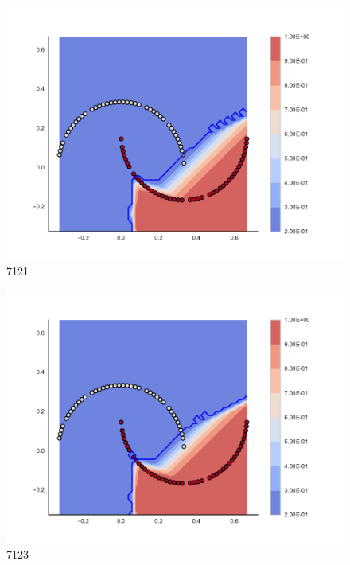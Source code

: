 \begin{subfigure}[b]{0.09\textwidth}
    \includegraphics[clip, trim=2.35cm 1.75cm 4.5cm 0cm,width=\textwidth]{img/convergence/7121.pdf}
    \caption{7121}
    \label{fig:convergence_7121}
\end{subfigure}
%
\begin{subfigure}[b]{0.09\textwidth}
    \includegraphics[clip, trim=2.35cm 1.75cm 4.5cm 0cm,width=\textwidth]{img/convergence/7123.pdf}
    \caption{7123}
    \label{fig:convergence_7123}
\end{subfigure}
%
